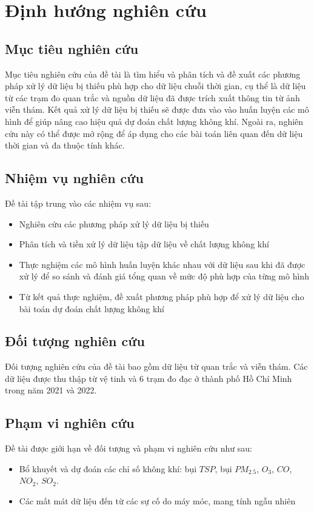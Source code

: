 \section{Định hướng nghiên cứu} 
\subsection{Mục tiêu nghiên cứu}
Mục tiêu nghiên cứu của đề tài là tìm hiểu và phân tích và đề xuất các phương pháp xử lý dữ liệu bị thiếu phù hợp cho dữ liệu chuỗi thời gian, cụ thể là dữ liệu từ các trạm đo quan trắc và nguồn dữ liệu đã được trích xuất thông tin từ ảnh viễn thám. Kết quả xử lý dữ liệu bị thiếu sẽ được đưa vào vào huấn luyện các mô hình để giúp nâng cao hiệu quả dự đoán chất lượng không khí. Ngoài ra, nghiên cứu này có thể được mở rộng để áp dụng cho các bài toán liên quan đến dữ liệu thời gian và đa thuộc tính khác.

\subsection{Nhiệm vụ nghiên cứu}
Đề tài tập trung vào các nhiệm vụ sau:
\begin{itemize}
    \item Nghiên cứu các phương pháp xử lý dữ liệu bị thiếu
    \item Phân tích và tiền xử lý dữ liệu tập dữ liệu về chất lượng không khí
     
    \item Thực nghiệm các mô hình huấn luyện khác nhau với dữ liệu sau khi đã được xử lý để so sánh và đánh giá tổng quan về mức độ phù hợp của từng mô hình 
    \item Từ kết quả thực nghiệm, đề xuất phương pháp phù hợp để xử lý dữ liệu cho bài toán dự đoán chất lượng không khí
\end{itemize}

\subsection{Đối tượng nghiên cứu}
Đối tượng nghiên cứu của đề tài bao gồm dữ liệu từ quan trắc và viễn thám. Các dữ liệu được thu thập từ vệ tinh và 6 trạm đo đạc ở thành phố Hồ Chí Minh trong năm 2021 và 2022. 


\subsection{Phạm vi nghiên cứu}
Đề tài được giới hạn về đối tượng và phạm vi nghiên cứu như sau:
\begin{itemize}
    \item Bổ khuyết và dự đoán các chỉ số không khí: bụi $TSP$, bụi $PM_{2.5}$, $O_3$, $CO$, $NO_2$, $SO_2$.
    \item Các mất mát dữ liệu đến từ các sự cố do máy móc, mang tính ngẫu nhiên
\end{itemize}